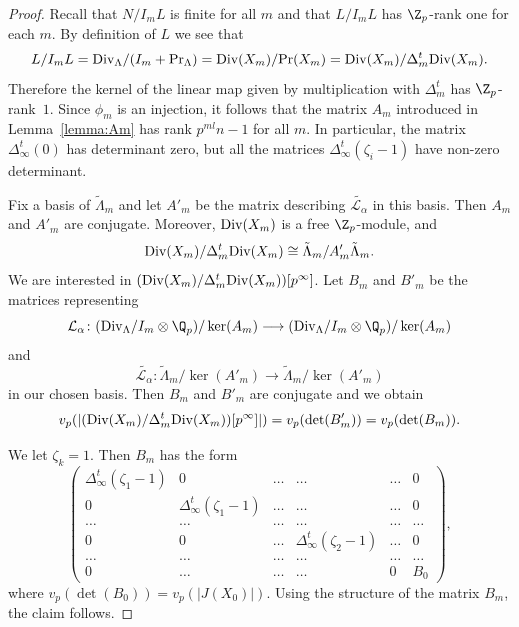 \begin{proof}
	Recall that $N/I_mL$ is finite for all $m$ and that $L/I_mL$ has $\Z_p$-rank one for each $m$. By definition of $L$ we see that \[L/I_m L=\textup{Div}_\Lambda/(I_m+\textup{Pr}_\Lambda)=\textup{Div}(X_m)/\textup{Pr}(X_m)=\textup{Div}(X_m)/\Delta^t_m\textup{Div}(X_m).\] 
	Therefore the kernel of the linear map given by multiplication with $\Delta^t_m$ has $\Z_p$-rank~$1$. Since $\phi_m$ is an injection, it follows that the matrix $A_m$ introduced in Lemma~\ref{lemma:Am} has rank $p^{ml}n-1$ for all $m$. In particular, the matrix $\Delta^t_\infty(0)$ has determinant zero, but all the matrices $\Delta^t_\infty(\zeta_i-1)$ have non-zero determinant. 
	
	Fix a basis of $\tilde{\Lambda}_m$ and let $A'_m$ be the matrix describing $\tilde{\mathcal{L}_\alpha}$ in this basis. Then $A_m$ and $A'_m$ are conjugate. 
	Moreover, $\textup{Div}(X_m)$ is a free $\Z_p$-module, and 
	\[ \textup{Div}(X_m)/\Delta^t_m \textup{Div}(X_m) \cong \tilde{\Lambda}_m/A'_m \tilde{\Lambda}_m. \] 
	We are interested in $(\textup{Div}(X_m)/\Delta^t_m\textup{Div}(X_m))[p^\infty]$. Let $B_m$ and $B'_m$ be the matrices representing 
	\[\mathcal{L}_\alpha \colon (\textup{Div}_\Lambda/I_m \otimes \Q_p)/\ker(A_m)\longrightarrow (\textup{Div}_\Lambda/I_m \otimes \Q_p)/\ker(A_m)\]
	and 
	\[\tilde{\mathcal{L}_\alpha}\colon \tilde{\Lambda}_m/\ker(A'_m)\longrightarrow \tilde{\Lambda}_m/\ker(A'_m)\]
	in our chosen basis. Then $B_m$ and $B'_m$ are conjugate and we obtain 
	\[v_p(\vert(\textup{Div}(X_m)/\Delta^t_m\textup{Div}(X_m))[p^\infty]\vert)=v_p(\det(B'_m))=v_p(\det(B_m)).\]
	
	We let $\zeta_k=1$. Then $B_m$ has the form
	\[\begin{pmatrix}
		\Delta^t_\infty(\zeta_1-1)&0&\dots &\dots&\dots&0\\
		0& \Delta^t_\infty(\zeta_1-1)&\dots &\dots&\dots&0\\
		\dots&\dots&\dots&\dots&\dots&\dots\\
		0&0&\dots&\Delta^t_\infty(\zeta_2-1)&\dots&0\\
		\dots&\dots&\dots&\dots&\dots&\dots\\
		0&\dots&\dots&\dots&0&B_0
	\end{pmatrix},\]
	where $v_p(\det(B_0))= v_p(\vert J(X_0)\vert)$.
	Using the structure of the matrix $B_m$, the claim follows. 
\end{proof}

